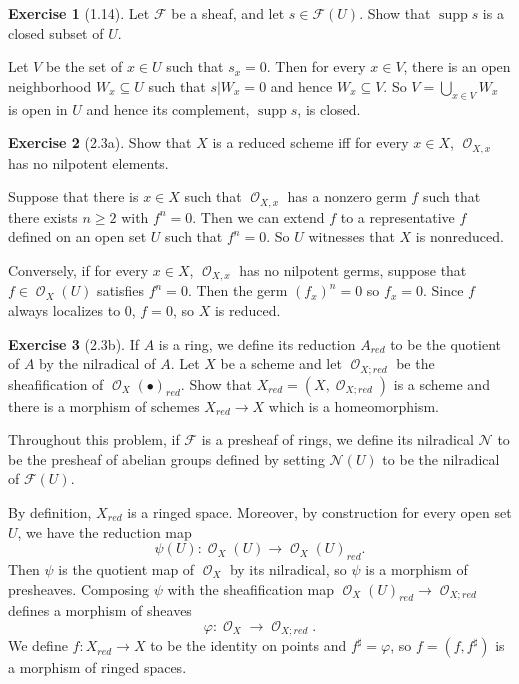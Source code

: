 \documentclass[10pt]{article}
\newcommand{\supp}{\operatorname{supp}}
\DeclareMathOperator{\Olo}{\mathscr O}
\theoremstyle{definition}
\newtheorem{exer}{Exercise}
\begin{document}
\begin{exer}[1.14]
Let $\mathscr F$ be a sheaf, and let $s \in \mathscr F(U)$.
Show that $\supp s$ is a closed subset of $U$.
\end{exer}

Let $V$ be the set of $x \in U$ such that $s_x = 0$.
Then for every $x \in V$, there is an open neighborhood $W_x \subseteq U$ such that $s|W_x = 0$ and hence $W_x \subseteq V$.
So $V = \bigcup_{x \in V} W_x$ is open in $U$ and hence its complement, $\supp s$, is closed.

\begin{exer}[2.3a]
Show that $X$ is a reduced scheme iff for every $x \in X$, $\Olo_{X, x}$ has no nilpotent elements.
\end{exer}

Suppose that there is $x \in X$ such that $\Olo_{X, x}$ has a nonzero germ $f$ such that there exists $n \geq 2$ with $f^n = 0$.
Then we can extend $f$ to a representative $f$ defined on an open set $U$ such that $f^n = 0$.
So $U$ witnesses that $X$ is nonreduced.

Conversely, if for every $x \in X$, $\Olo_{X, x}$ has no nilpotent germs, suppose that $f \in \Olo_X(U)$ satisfies $f^n = 0$.
Then the germ $(f_x)^n = 0$ so $f_x = 0$.
Since $f$ always localizes to $0$, $f = 0$, so $X$ is reduced.

\begin{exer}[2.3b]
If $A$ is a ring, we define its reduction $A_{red}$ to be the quotient of $A$ by the nilradical of $A$.
Let $X$ be a scheme and let $\Olo_{X;red}$ be the sheafification of $\Olo_X(\bullet)_{red}$.
Show that $X_{red} = (X, \Olo_{X;red})$ is a scheme and there is a morphism of schemes $X_{red} \to X$ which is a homeomorphism.
\end{exer}

Throughout this problem, if $\mathscr F$ is a presheaf of rings, we define its nilradical $\mathscr N$ to be the presheaf of abelian groups defined by setting $\mathscr N(U)$ to be the nilradical of $\mathscr F(U)$.

By definition, $X_{red}$ is a ringed space.
Moreover, by construction for every open set $U$, we have the reduction map
$$\psi(U): \Olo_X(U) \to \Olo_X(U)_{red}.$$
Then $\psi$ is the quotient map of $\Olo_X$ by its nilradical, so $\psi$ is a morphism of presheaves.
Composing $\psi$ with the sheafification map $\Olo_X(U)_{red} \to \Olo_{X;red}$ defines a morphism of sheaves
$$\varphi: \Olo_X \to \Olo_{X;red}.$$
We define $f: X_{red} \to X$ to be the identity on points and $f^\sharp = \varphi$, so $f = (f, f^\sharp)$ is a morphism of ringed spaces.
\end{document}
